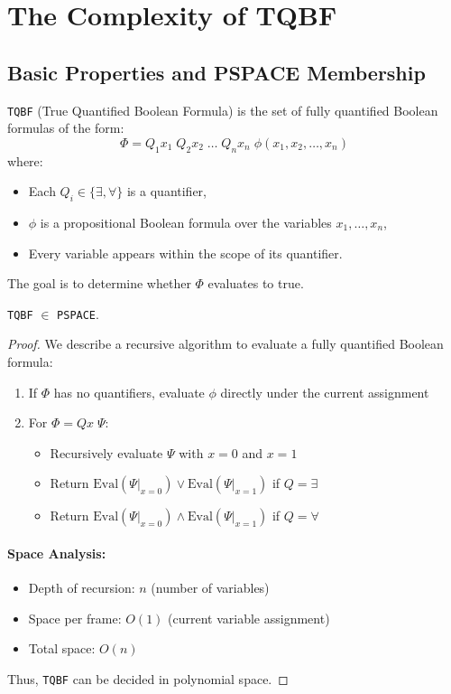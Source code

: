 \section{The Complexity of TQBF}

\subsection{Basic Properties and PSPACE Membership}

\begin{definition}[TQBF]
\texttt{TQBF} (True Quantified Boolean Formula) is the set of fully quantified Boolean formulas of the form:
\[
\Phi = Q_1 x_1 \; Q_2 x_2 \; \dots \; Q_n x_n \; \phi(x_1, x_2, \dots, x_n)
\]
where:
\begin{itemize}
    \item Each $Q_i \in \{\exists, \forall\}$ is a quantifier,
    \item $\phi$ is a propositional Boolean formula over the variables $x_1, \dots, x_n$,
    \item Every variable appears within the scope of its quantifier.
\end{itemize}
The goal is to determine whether $\Phi$ evaluates to true.
\end{definition}

\begin{theorem}
\texttt{TQBF} $\in$ \texttt{PSPACE}.
\end{theorem}

\begin{proof}
We describe a recursive algorithm to evaluate a fully quantified Boolean formula:
\begin{enumerate}
    \item If $\Phi$ has no quantifiers, evaluate $\phi$ directly under the current assignment
    \item For $\Phi = Qx \; \Psi$:
    \begin{itemize}
        \item Recursively evaluate $\Psi$ with $x=0$ and $x=1$
        \item Return $\text{Eval}(\Psi|_{x=0}) \lor \text{Eval}(\Psi|_{x=1})$ if $Q = \exists$
        \item Return $\text{Eval}(\Psi|_{x=0}) \land \text{Eval}(\Psi|_{x=1})$ if $Q = \forall$
    \end{itemize}
\end{enumerate}

\paragraph{Space Analysis:}
\begin{itemize}
    \item Depth of recursion: $n$ (number of variables)
    \item Space per frame: $O(1)$ (current variable assignment)
    \item Total space: $O(n)$
\end{itemize}
Thus, \texttt{TQBF} can be decided in polynomial space.
\end{proof}

